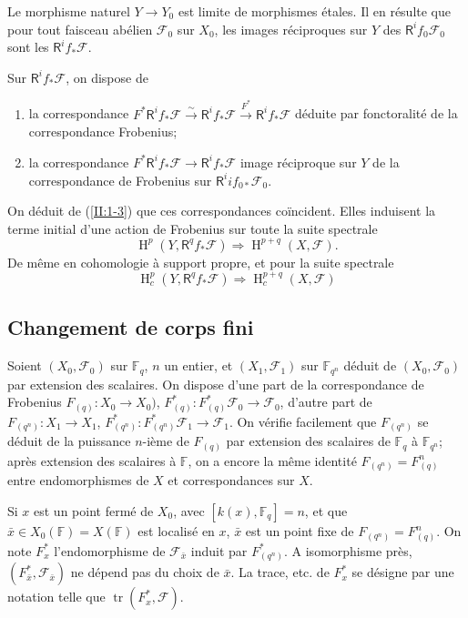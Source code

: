 \documentclass{book}
\DeclareMathOperator{\h}{H}
\DeclareMathOperator{\tr}{tr}
\newcommand{\cF}{\mathcal{F}}
\newcommand{\dF}{\mathbb{F}}
\newcommand{\iso}{\xrightarrow\sim}
\newcommand{\R}{\mathsf{R}}
\begin{document}
Le morphisme naturel $Y\to Y_0$ est limite de morphismes étales. Il en 
résulte que pour tout faisceau abélien $\cF_0$ sur $X_0$, les images 
réciproques sur $Y$ des $\R^if_0\cF_0$ sont les $\R^if_*\cF$. 

Sur $\R^if_*\cF$, on dispose de 
\begin{enumerate}[\indent a)]
  \item la correspondance 
    $F^*\R^i f_*\cF \iso \R^i f_*\cF \xrightarrow{F^*} \R^if_*\cF$ déduite 
    par fonctoralité de la correspondance Frobenius; 
  \item la correspondance $F^*\R^if_*\cF\to\R^if_*\cF$ image réciproque sur 
    $Y$ de la correspondance de Frobenius sur $\R^ii f_{0*}\cF_0$. 
\end{enumerate}

On déduit de (\ref{II:1-3}) que ces correspondances coïncident. Elles 
induisent la terme initial d'une action de Frobenius sur toute la suite 
spectrale 
\[
  \h^p(Y,\R^q f_*\cF) \Rightarrow \h^{p+q}(X,\cF) \text{.}
\]
De même en cohomologie à support propre, et pour la suite spectrale 
\[
  \h_c^p(Y,\R^q f_* \cF) \Rightarrow \h_c^{p+q}(X,\cF)
\]





\subsection{Changement de corps fini}\label{II:1-5}

Soient $(X_0,\cF_0)$ sur $\dF_q$, $n$ un entier, et $(X_1,\cF_1)$ sur 
$\dF_{q^n}$ déduit de $(X_0,\cF_0)$ par extension des scalaires. On dispose 
d'une part de la correspondance de Frobenius $F_{(q)}:X_0\to X_0)$, 
$F_{(q)}^*:F_{(q)}^*\cF_0\to \cF_0$, d'autre part de 
$F_{(q^n)}:X_1\to X_1$, $F_{(q^n)}^*:F_{(q^n)}^*\cF_1\to\cF_1$. On vérifie 
facilement que $F_{(q^n)}$ se déduit de la puissance $n$-ième de $F_{(q)}$ 
par extension des scalaires de $\dF_q$ à $\dF_{q^n}$; après extension des 
scalaires à $\dF$, on a encore la même identité $F_{(q^n)}=F_{(q)}^n$ 
entre endomorphismes de $X$ et correspondances sur $X$. 

Si $x$ est un point fermé de $X_0$, avec $[k(x),\dF_q]=n$, et que 
$\bar x\in X_0(\dF) = X(\dF)$ est localisé en $x$, $\bar x$ est un point 
fixe de $F_{(q^n)}=F_{(q)}^n$. On note $F_x^*$ l'endomorphisme de 
$\cF_{\bar x}$ induit par $F_{(q^n)}^*$. A isomorphisme près, 
$(F_{\bar x}^*,\cF_{\bar x})$ ne dépend pas du choix de $\bar x$. La trace, 
etc. de $F_x^*$ se désigne par une notation telle que 
$\tr(F_x^*,\cF)$. 
\end{document}
